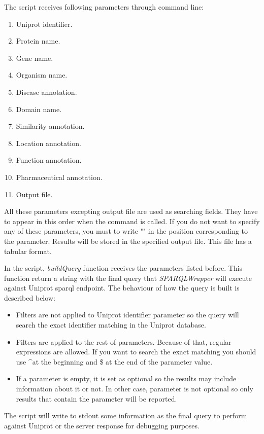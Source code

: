 \documentclass[12pt]{article}
\begin{document}
The script receives following parameters through command line:
\begin{enumerate}
	\item Uniprot identifier.
	\item Protein name.
	\item Gene name.
	\item Organism name.
	\item Disease annotation.
	\item Domain name.
	\item Similarity annotation.
	\item Location annotation.
	\item Function annotation.
	\item Pharmaceutical annotation.
	\item Output file.
\end{enumerate}
All these parameters excepting output file are used as searching fields. They have to appear in this order when the command is called. If you do not want to specify any of these parameters, you must to write "" in the position corresponding to the parameter. Results will be stored in the specified output file. This file has a tabular format.

In the script, \textit{buildQuery} function receives the parameters listed before. This function return a string with the final query that \textit{SPARQLWrapper} will execute against Uniprot sparql endpoint. The behaviour of how the query is built is described below:
\begin{itemize}
	\item Filters are not applied to Uniprot identifier parameter so the query will search the exact identifier matching in the Uniprot database.
	\item Filters are applied to the rest of parameters. Because of that, regular expressions are allowed. If you want to search the exact matching you should use \textasciicircum at the beginning and \$ at the end of the parameter value.
	\item If a parameter is empty, it is set as optional so the results may include information about it or not. In other case, parameter is not optional so only results that contain the parameter will be reported.
\end{itemize}

The script will write to stdout some information as the final query to perform against Uniprot or the server response for debugging purposes.

\clearpage
\end{document}
